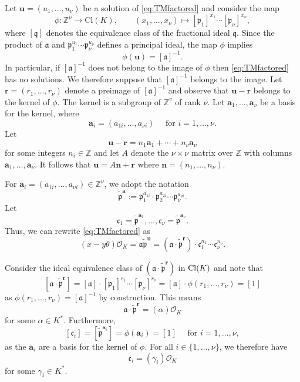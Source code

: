 Let $\mathbf{u}=(u_1,\dots, u_{\nu})$ be a solution of \eqref{eq:TMfactored} and consider the map
\[\phi : \mathbb{Z}^{\nu} \rightarrow \text{Cl}(K), \qquad (x_1,\dots ,x_{\nu}) \mapsto [\mathfrak{p}_1]^{x_1}\cdots [\mathfrak{p}_{\nu}]^{x_{\nu}},\]
where $[ \mathfrak{q} ]$ denotes the equivalence class of the fractional ideal $\mathfrak{q}$. 
Since the product of $\mathfrak{a}$ and $\mathfrak{p}_1^{u_1}\cdots \mathfrak{p}_{\nu}^{u_{\nu}}$ defines a principal ideal, the map $\phi$ implies
\[\phi(\mathbf{u})=[\mathfrak{a}]^{-1}.\]
In particular, if $[\mathfrak{a}]^{-1}$ does not belong to the image of $\phi$ then \eqref{eq:TMfactored} has no solutions. We therefore suppose that $[\mathfrak{a}]^{-1}$ belongs to the image. Let $\mathbf{r}=(r_1,\dotsc,r_{\nu})$ denote a preimage of $[\mathfrak{a}]^{-1}$ and observe that $\mathbf{u} - \mathbf{r}$ belongs to the kernel of $\phi$. The kernel is a subgroup of $\mathbb{Z}^v$ of rank $\nu$. Let $\mathbf{a}_1,\dots,\mathbf{a}_{\nu}$ be a basis for the kernel, where
\[\mathbf{a}_i = (a_{1i}, \dots, a_{\nu i}) \quad \text{ for } i = 1, \dots, \nu.\]
Let
\[\mathbf{u}-\mathbf{r}=n_1 \mathbf{a}_1+\cdots + n_{\nu} \mathbf{a}_{\nu}\]
for some integers $n_i \in \mathbb{Z}$ and let $A$ denote the $\nu \times \nu$ matrix over $\mathbb{Z}$ with columns $\mathbf{a}_1,\dots,\mathbf{a}_{\nu}$. It follows that $\mathbf{u}= A\mathbf{n}+\mathbf{r}$ where $\mathbf{n} = (n_1,\dots,n_{\nu})$.

For $\mathbf{a}_i=(a_{1i},\dotsc,a_{\nu i}) \in \mathbb{Z}^{\nu}$, we adopt the notation 
\[\tilde{\mathfrak{p}}^\mathbf{a} :=\mathfrak{p}_1^{a_{1i}}\cdot \mathfrak{p}_2^{a_{2i}} \cdots \mathfrak{p}_{\nu}^{a_{\nu i}}.\]
Let
\[\mathfrak{c}_1= \tilde{\mathfrak{p}}^{\mathbf{a}_1},\dotsc,\mathfrak{c}_{\nu}= \tilde{\mathfrak{p}}^{\mathbf{a}_{\nu}}.\]
Thus, we can rewrite \eqref{eq:TMfactored} as
\[(x-y\theta) \mathcal{O}_K = \mathfrak{a} \tilde{\mathfrak{p}}^{\mathbf{u}} = (\mathfrak{a} \cdot \tilde{\mathfrak{p}}^\mathbf{r}) \cdot \mathfrak{c}_1^{n_1}\cdots \mathfrak{c}_{\nu}^{n_{\nu}}.\]

Consider the ideal equivalence class of $(\mathfrak{a} \cdot \tilde{\mathfrak{p}}^\mathbf{r})$ in $\operatorname{Cl}(K)$ and note that
\[[\mathfrak{a} \cdot \tilde{\mathfrak{p}}^\mathbf{r}] 
	= [\mathfrak{a}] \cdot [\mathfrak{p}_1]^{r_1}\cdots [\mathfrak{p}_{\nu}]^{r_{\nu}} 
	= [\mathfrak{a}]\cdot \phi(r_1,\dotsc,r_{\nu})=[1]\]
as $\phi(r_1,\dotsc,r_{\nu})=[\mathfrak{a}]^{-1}$ by construction. This means 
\[\mathfrak{a} \cdot \tilde{\mathfrak{p}}^\mathbf{r}= (\alpha) \mathcal{O}_K\]
for some $\alpha \in K^*$. Furthermore, 
\[[\mathfrak{c}_i] = [\tilde{\mathfrak{p}}^{\mathbf{a}_i}] = \phi(\mathbf{a}_i) = [1] \quad \text{ for } i = 1, \dots, \nu,\]
as the $\mathbf{a}_i$ are a basis for the kernel of $\phi$. For all $i \in \{1, \dots, {\nu}\}$, we therefore have
\[\mathfrak{c}_i= (\gamma_i) \mathcal{O}_K\]
for some $\gamma_i \in K^*$.

